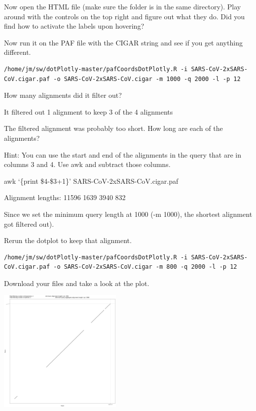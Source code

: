 \documentclass[
]{book}
\begin{document}
Now open the HTML file (make sure the folder is in the same directory). Play around with the controls on the top right and figure out what they do. Did you find how to activate the labels upon hovering?

Now run it on the PAF file with the CIGAR string and see if you get anything different.

\begin{verbatim}
/home/jm/sw/dotPlotly-master/pafCoordsDotPlotly.R -i SARS-CoV-2xSARS-CoV.cigar.paf -o SARS-CoV-2xSARS-CoV.cigar -m 1000 -q 2000 -l -p 12
\end{verbatim}

\hfill\break

How many alignments did it filter out?

It filtered out 1 alignment to keep 3 of the 4 alignments

\hfill\break

The filtered alignment was probably too short. How long are each of the alignments?

Hint: You can use the start and end of the alignments in the query that are in columns 3 and 4. Use awk and subtract those columns.

awk `\{print \$4-\$3+1\}' SARS-CoV-2xSARS-CoV.cigar.paf

Alignment lengths:
11596
1639
3940
832

\hfill\break

Since we set the minimum query length at 1000 (-m 1000), the shortest alignment got filtered out).

Rerun the dotplot to keep that alignment.

\begin{verbatim}
/home/jm/sw/dotPlotly-master/pafCoordsDotPlotly.R -i SARS-CoV-2xSARS-CoV.cigar.paf -o SARS-CoV-2xSARS-CoV.cigar -m 800 -q 2000 -l -p 12
\end{verbatim}

\hfill\break

Download your files and take a look at the plot.

\includegraphics[width=0.45\textwidth,height=\textheight]{./Figures/SARS-CoV-2xSARS-CoV.cigar.png}
\end{document}
